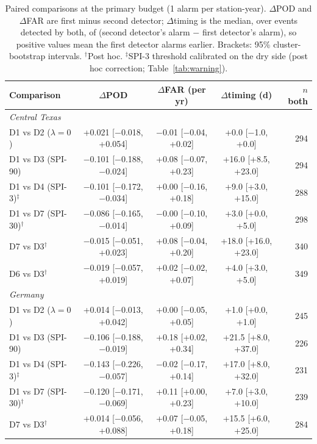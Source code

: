 \begin{table}[tbp]
\caption{Paired comparisons at the primary budget (1 alarm per station-year). $\Delta$POD and
$\Delta$FAR are first minus second detector; $\Delta$timing is the median, over events detected by both,
of (second detector's alarm $-$ first detector's alarm), so positive values mean the first detector
alarms earlier. Brackets: 95\% cluster-bootstrap intervals. $^{\dagger}$Post hoc. $^{\ddagger}$SPI-3
threshold calibrated on the dry side (post hoc correction; Table~\ref{tab:warning}).}
\label{tab:paired}
\footnotesize\setlength{\tabcolsep}{4pt}
\begin{tabular*}{\textwidth}{@{\extracolsep\fill}lcccr}
\toprule
Comparison & $\Delta$POD & $\Delta$FAR (per yr) & $\Delta$timing (d) & $n$ both\\
\midrule
\multicolumn{5}{l}{\textit{Central Texas}}\\
\quad D1 vs D2 ($\lambda=0$) & +0.021 [$-$0.018, +0.054] & $-$0.01 [$-$0.04, +0.02] & +0.0 [$-$1.0, +0.0] & 294 \\
\quad D1 vs D3 (SPI-90) & $-$0.101 [$-$0.188, $-$0.024] & +0.08 [$-$0.07, +0.23] & +16.0 [+8.5, +23.0] & 294 \\
\quad D1 vs D4 (SPI-3)$^{\ddagger}$ & $-$0.101 [$-$0.172, $-$0.034] & +0.00 [$-$0.16, +0.18] & +9.0 [+3.0, +15.0] & 288 \\
\quad D1 vs D7 (SPI-30)$^{\dagger}$ & $-$0.086 [$-$0.165, $-$0.014] & $-$0.00 [$-$0.10, +0.09] & +3.0 [+0.0, +5.0] & 298 \\
\quad D7 vs D3$^{\dagger}$ & $-$0.015 [$-$0.051, +0.023] & +0.08 [$-$0.04, +0.20] & +18.0 [+16.0, +23.0] & 340 \\
\quad D6 vs D3$^{\dagger}$ & $-$0.019 [$-$0.057, +0.019] & +0.02 [$-$0.02, +0.07] & +4.0 [+3.0, +5.0] & 349 \\
\midrule
\multicolumn{5}{l}{\textit{Germany}}\\
\quad D1 vs D2 ($\lambda=0$) & +0.014 [$-$0.013, +0.042] & +0.00 [$-$0.05, +0.05] & +1.0 [+0.0, +1.0] & 245 \\
\quad D1 vs D3 (SPI-90) & $-$0.106 [$-$0.188, $-$0.019] & +0.18 [+0.02, +0.34] & +21.5 [+8.0, +37.0] & 226 \\
\quad D1 vs D4 (SPI-3)$^{\ddagger}$ & $-$0.143 [$-$0.226, $-$0.057] & $-$0.02 [$-$0.17, +0.14] & +17.0 [+8.0, +32.0] & 231 \\
\quad D1 vs D7 (SPI-30)$^{\dagger}$ & $-$0.120 [$-$0.171, $-$0.069] & +0.11 [+0.00, +0.23] & +7.0 [+3.0, +10.0] & 239 \\
\quad D7 vs D3$^{\dagger}$ & +0.014 [$-$0.056, +0.088] & +0.07 [$-$0.05, +0.18] & +15.5 [+6.0, +25.0] & 284 \\

\end{tabular*}
\end{table}
